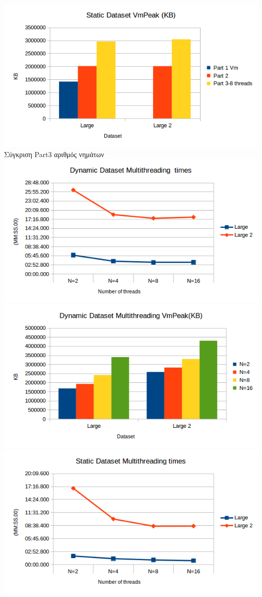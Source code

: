 \documentclass[12pt]{article}
\begin{document}
\includegraphics[scale=0.5]{StaticDatasets_VmPeak.png}\\
Σύγκριση Part3 αριθμός νημάτων\\
\includegraphics[scale=0.5]{DynamicDatasetMultithreading_times.png}
\includegraphics[scale=0.5]{DynamicDatasetMultithreading_VmPeak.png}\\
\includegraphics[scale=0.5]{DynamicStaticMultithreading_times.png}
\end{document}

